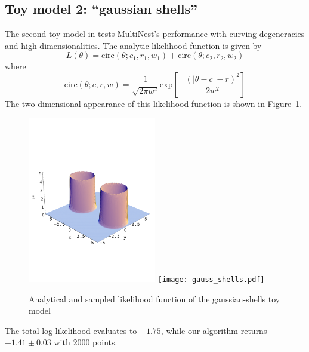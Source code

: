 \documentclass{article}
\begin{document}
\subsection{Toy model 2: ``gaussian shells''}
The second toy model in \cite{2009MNRAS.398.1601F} tests MultiNest's performance with curving degeneracies and high dimensionalities. The analytic likelihood function is given by
\[L(\theta) = \mathrm{circ}(\theta;c_1,r_1,w_1)+\mathrm{circ}(\theta;c_2,r_2,w_2)\]
where
\[ \mathrm{circ}(\theta;c,r,w) = \frac{1}{\sqrt{2\pi w^2}}\mathrm{exp}\left[-\frac{(|\theta - c|-r)^2}{2w^2}\right]\]
The two dimensional appearance of this likelihood function is shown in Figure~\ref{gaussshell}.

\begin{figure}[h]
\includegraphics[width=0.5\textwidth]{gauss_shells_analytic.pdf}
\texttt{[image: gauss\_shells.pdf]}
\caption{Analytical and sampled likelihood function of the gaussian-shells toy model}
\label{gaussshell}
\end{figure}

The total log-likelihood evaluates to $-1.75$, while our algorithm returns $-1.41\pm 0.03$  with 2000 points.
\end{document}
